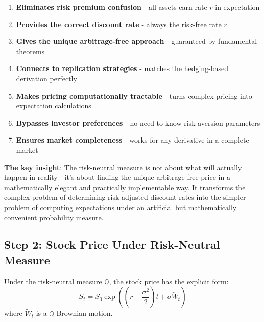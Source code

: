 \documentclass[
  letterpaper,
  DIV=11,
  numbers=noendperiod]{scrartcl}
\providecommand{\tightlist}{%
  \setlength{\itemsep}{0pt}\setlength{\parskip}{0pt}}\usepackage{longtable,booktabs,array}
\begin{document}
\begin{tcolorbox}
\begin{enumerate}
\def\labelenumi{\arabic{enumi}.}
\tightlist
\item
  \textbf{Eliminates risk premium confusion} - all assets earn rate
  \(r\) in expectation
\item
  \textbf{Provides the correct discount rate} - always the risk-free
  rate \(r\)
\item
  \textbf{Gives the unique arbitrage-free approach} - guaranteed by
  fundamental theorems
\item
  \textbf{Connects to replication strategies} - matches the
  hedging-based derivation perfectly
\item
  \textbf{Makes pricing computationally tractable} - turns complex
  pricing into expectation calculations
\item
  \textbf{Bypasses investor preferences} - no need to know risk aversion
  parameters
\item
  \textbf{Ensures market completeness} - works for any derivative in a
  complete market
\end{enumerate}

\textbf{The key insight}: The risk-neutral measure is not about what
will actually happen in reality - it's about finding the unique
arbitrage-free price in a mathematically elegant and practically
implementable way. It transforms the complex problem of determining
risk-adjusted discount rates into the simpler problem of computing
expectations under an artificial but mathematically convenient
probability measure.

\end{tcolorbox}

\hypertarget{step-2-stock-price-under-risk-neutral-measure}{%
\subsection{Step 2: Stock Price Under Risk-Neutral
Measure}\label{step-2-stock-price-under-risk-neutral-measure}}

\begin{tcolorbox}[enhanced jigsaw, colback=white, rightrule=.15mm, coltitle=black, left=2mm, colframe=quarto-callout-important-color-frame, breakable, arc=.35mm, bottomtitle=1mm, toptitle=1mm, titlerule=0mm, leftrule=.75mm, colbacktitle=quarto-callout-important-color!10!white, title={Lemma 3.1 (Stock Price Solution Under \(\mathbb{Q}\))}, toprule=.15mm, opacitybacktitle=0.6, bottomrule=.15mm, opacityback=0]

Under the risk-neutral measure \(\mathbb{Q}\), the stock price has the
explicit form:
\[S_t = S_0 \exp\left(\left(r - \frac{\sigma^2}{2}\right)t + \sigma \tilde{W}_t\right)\]
where \(\tilde{W}_t\) is a \(\mathbb{Q}\)-Brownian motion.

\end{tcolorbox}
\end{document}
